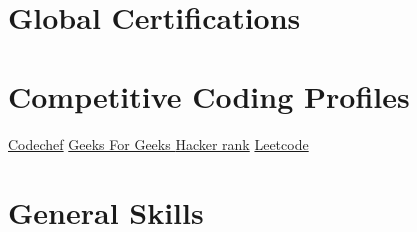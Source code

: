 \documentclass[%
               doublesided,
               paper=a4,
               fontsize=11pt
              ]{my-resume}
\begin{document}
{    \section{ Global Certifications}
  
 
        \section[\faIcon{code}]{Competitive Coding Profiles}
        \href{https://www.codechef.com/users/el_2000090063}{  Codechef}  \addvspace{2cm}      \href{https://auth.geeksforgeeks.org/user/karthikveluru777/practice/} {\addvspace{2cm}    Geeks For Geeks }  \addvspace{2cm}   \href{https://www.hackerrank.com/2000090063KR}{   Hacker rank} \addvspace{2cm}  \href{https://leetcode.com/2000090063/}{\addvspace{2cm}   Leetcode}
        
        
     
    
     
    
   
    
   
 

    
 
 \section{General Skills}
    \smallskip %
       
  

    
}
\makebody
\clearpage


\pagestyle{highlightmain}

\highlightbar{\hfill}
\end{document}

